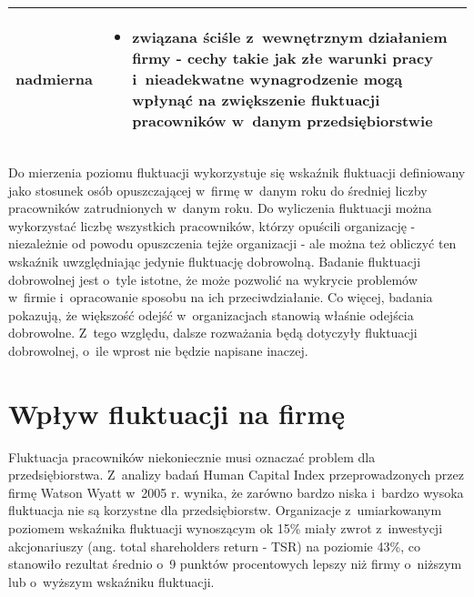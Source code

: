 \begin{minipage}{\textwidth}
\begin{table}[H]
\begin{center}
\begin{tabular}{|P{.15\textwidth}|P{.75\textwidth}|}
                         nadmierna &
                         \begin{itemize}
                             \item związana ściśle z~wewnętrznym działaniem firmy - cechy takie jak złe warunki pracy i~nieadekwatne wynagrodzenie mogą wpłynąć na zwiększenie fluktuacji pracowników w~danym przedsiębiorstwie
                         \end{itemize} \\
                         \hline
                     \end{tabular}
                 \end{center}
                 \raggedright{}
                 \vspace{0.75cm}
             \end{table}
\end{minipage}

Do mierzenia poziomu fluktuacji wykorzystuje się wskaźnik fluktuacji definiowany jako stosunek osób opuszczającej w~firmę w~danym roku do średniej liczby pracowników zatrudnionych w~danym roku.
Do wyliczenia fluktuacji można wykorzystać liczbę wszystkich pracowników, którzy opuścili organizację - niezależnie od powodu opuszczenia tejże organizacji - ale można też obliczyć ten wskaźnik uwzględniając jedynie fluktuację dobrowolną.
Badanie fluktuacji dobrowolnej jest o~tyle istotne, że może pozwolić na wykrycie problemów w~firmie i~opracowanie sposobu na ich przeciwdziałanie.
Co więcej, badania pokazują, że większość odejść w~organizacjach stanowią właśnie odejścia dobrowolne.
Z~tego względu, dalsze rozważania będą dotyczyły fluktuacji dobrowolnej, o~ile wprost nie będzie napisane inaczej.


\section{Wpływ fluktuacji na firmę}\label{sec:wplyw-fluktuacji-na-firme}
Fluktuacja pracowników niekoniecznie musi oznaczać problem dla przedsiębiorstwa.
Z~analizy badań Human Capital Index przeprowadzonych przez firmę Watson Wyatt w~2005 r. wynika,
że zarówno bardzo niska i~bardzo wysoka fluktuacja nie są korzystne dla przedsiębiorstw.
Organizacje z~umiarkowanym poziomem wskaźnika fluktuacji wynoszącym ok 15\%
miały zwrot z~inwestycji akcjonariuszy (ang. total shareholders return - TSR) na poziomie 43\%,
co stanowiło rezultat średnio o~9 punktów procentowych lepszy niż firmy o~niższym lub o~wyższym wskaźniku fluktuacji.

